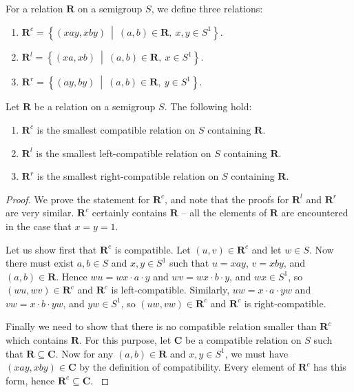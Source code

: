 \begin{definition}
  \label{def:rc}
  For a relation $\mathbf{R}$ on a semigroup $S$, we define three relations:
  \begin{enumerate}[\rm(1)]
  \item
    $\mathbf{R}^c = \left\{(xay, xby) ~\middle|~ (a,b) \in \mathbf{R},~x,y \in
      S^1\right\}$.
  \item
    $\mathbf{R}^l = \left\{(xa, xb) ~\middle|~ (a,b) \in \mathbf{R},~x \in
      S^1\right\}$.
  \item
    $\mathbf{R}^r = \left\{(ay, by) ~\middle|~ (a,b) \in \mathbf{R},~y \in
      S^1\right\}$.
  \end{enumerate}
\end{definition}

\begin{lemma}
  \label{lem:rc}
  Let $\mathbf{R}$ be a relation on a semigroup $S$.
  The following hold:
  \begin{enumerate}[\rm(1)]
  \item $\mathbf{R}^c$ is the smallest compatible relation on $S$ containing
    $\mathbf{R}$.
  \item $\mathbf{R}^l$ is the smallest left-compatible relation on $S$
    containing $\mathbf{R}$.
  \item $\mathbf{R}^r$ is the smallest right-compatible relation on $S$
    containing $\mathbf{R}$.
  \end{enumerate}
  \begin{proof}
    We prove the statement for $\mathbf{R}^c$, and note that the proofs for
    $\mathbf{R}^l$ and $\mathbf{R}^r$ are very similar.
    $\mathbf{R}^c$ certainly contains $\mathbf{R}$ -- all the elements of
    $\mathbf{R}$ are encountered in the case that $x=y=1$.

    Let us show first that $\mathbf{R}^c$ is compatible.
    Let $(u,v) \in \mathbf{R}^c$ and let $w \in S$.  Now there must exist $a,b
    \in S$ and $x,y \in S^1$ such that $u=xay$, $v=xby$, and $(a,b) \in
    \mathbf{R}$.  Hence
    $wu = wx \cdot a \cdot y$ and
    $wv = wx \cdot b \cdot y$, and $wx \in S^1$,
    so $(wu,wv) \in \mathbf{R}^c$ and $\mathbf{R}^c$ is left-compatible.
    Similarly,
    $uw = x \cdot a \cdot yw$ and
    $vw = x \cdot b \cdot yw$, and $yw \in S^1$,
    so $(uw,vw) \in \mathbf{R}^c$ and $\mathbf{R}^c$ is right-compatible.

    Finally we need to show that there is no compatible relation smaller than
    $\mathbf{R}^c$ which contains $\mathbf{R}$.  For this purpose, let
    $\mathbf{C}$ be a compatible relation on $S$ such that $\mathbf{R} \subseteq
    \mathbf{C}$.  Now for any $(a,b) \in \mathbf{R}$ and $x,y \in S^1$, we must
    have $(xay,xby) \in \mathbf{C}$ by the definition of compatibility.  Every
    element of $\mathbf{R}^c$ has this form, hence $\mathbf{R}^c \subseteq
    \mathbf{C}$. \cite[p.26]{howie}
  \end{proof}
\end{lemma}

